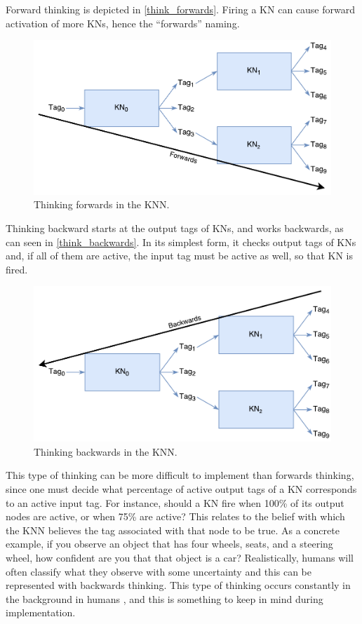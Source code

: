 \documentclass[titlepage,11pt]{article}
\begin{document}
Forward thinking is depicted in \autoref{think_forwards}. Firing a KN can cause forward activation of more KNs, hence the ``forwards'' naming.

\begin{figure}[!htb]
	\includegraphics[width=\columnwidth]{figures/forwards_thinking.pdf}
	\caption{Thinking forwards in the KNN.}
	\label{think_forwards}
\end{figure}

Thinking backward starts at the output tags of KNs, and works backwards, as can seen in \autoref{think_backwards}. In its simplest form, it checks output tags of KNs and, if all of them are active, the input tag must be active as well, so that KN is fired.

\begin{figure}[!htb]
	\includegraphics[width=\columnwidth]{figures/backwards_thinking.pdf}
	\caption{Thinking backwards in the KNN.}
	\label{think_backwards}
\end{figure}

This type of thinking can be more difficult to implement than forwards thinking, since one must decide what percentage of active output tags of a KN corresponds to an active input tag. For instance, should a KN fire when 100\% of its output nodes are active, or when 75\% are active? This relates to the belief with which the KNN believes the tag associated with that node to be true. As a concrete example, if you observe an object that has four wheels, seats, and a steering wheel, how confident are you that that object is a car? Realistically, humans will often classify what they observe with some uncertainty \cite{uncertainty} and this can be represented with backwards thinking. This type of thinking occurs constantly in the background in humans \cite{vybihal-knowledge}, and this is something to keep in mind during implementation.
\end{document}
